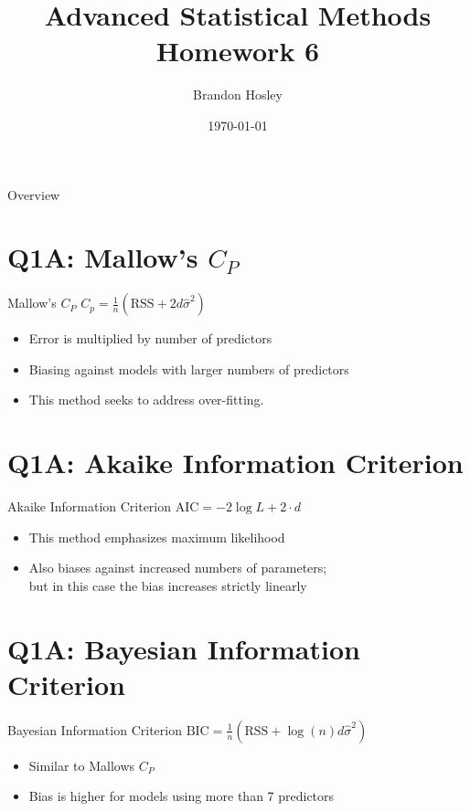 \documentclass{beamer}
\title{Advanced Statistical Methods \\ Homework 6}
\author{Brandon Hosley}
\institute{University of Illinois - Springfield}
\date{\today}
\begin{document}
\frame{\titlepage}

\begin{frame}{Overview}
\tableofcontents
\end{frame}

\section[Q1A]{Q1A: Mallow's $C_P$}
\begin{frame}{Mallow's $C_P$}
	\centering 
	$ C_p = \frac{1}{n}(\text{RSS} + 2d\hat{\sigma}^2) $
	\vspace{3em}
	\begin{itemize}
		\item Error is multiplied by number of predictors
		\item Biasing against models with larger numbers of predictors
		\item This method seeks to address over-fitting.
	\end{itemize}
\end{frame}

\section[Q1A]{Q1A: Akaike Information Criterion}
\begin{frame}{Akaike Information Criterion}
	\centering 
	$ \text{AIC} = -2 \log L + 2 \cdot d $
	\vspace{3em}
	\begin{itemize}
		\item This method emphasizes maximum likelihood
		\item Also biases against increased numbers of parameters; \\
			but in this case the bias increases strictly linearly
	\end{itemize}
\end{frame}

\section[Q1A]{Q1A: Bayesian Information Criterion}
\begin{frame}{Bayesian Information Criterion}
	\centering 
	$ \text{BIC} = \frac{1}{n}(\text{RSS} + \log(n) d\hat{\sigma}^2) $
	\vspace{3em}
	\begin{itemize}
		\item Similar to Mallows $C_P$
		\item Bias is higher for models using more than 7 predictors
	\end{itemize}
\end{frame}
\end{document}
